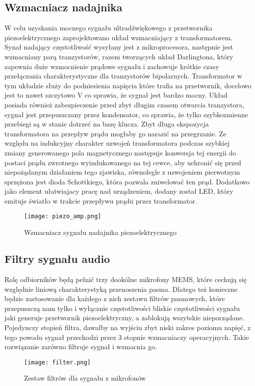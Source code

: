 \subsection{Wzmacniacz nadajnika}
W celu uzyskania mocnego sygnału ultradźwiękowego z przetwornika piezoelektrycznego zaprojektowano układ wzmacniający z transformatorem. 
Synał nadający częstotliwość wysyłany jest z mikroprocesora, następnie jest wzmacniany parą tranzystorów, razem tworzących układ Darlingtona, 
który zapewnia duże wzmocnienie prądowe sygnału i zachowuje krótkie czasy przełączania charakterystyczne dla tranzystorów bipolarnych.
Transformator w tym układzie służy do podniesienia napięcia które trafia na przetwornik, docelowo jest to nawet szczytowo \unit[80]{V} co sprawia, 
że sygnał jest bardzo mocny.
Układ posiada również zabezpieczenie przed zbyt długim czasem otwarcia tranzystora, sygnał jest przepuszczany przez kondensator, 
co sprawia, że tylko szybkozmienne przebiegi są w stanie dotrzeć na bazę klucza. 
Zbyt długa ekspozycja transformatora na przepływ prądu mogłaby go narazić na przegrzanie.
Ze względu na indukcyjny charakter uzwojeń transformatora podczas szybkiej zmiany generowanego pola magnetycznego następuje 
konwersja tej energii do postaci prądu zwrotnego wyindukowanego na tej cewce, aby uchronić się przed niepożądanym działaniem tego zjawiska, 
równolegle z uzwojeniem pierwotnym sprzężona jest dioda Schottkiego, która pozwala zniwelować ten prąd.
Dodatkowo jako element ułatwiajacy pracę nad urządzeniem, dodany został LED, który emituje światło w trakcie przepływu prądu przez transformator.
\begin{figure}[ht!]
    \centering
    \texttt{[image: piezo\_amp.png]}
    \caption{Wzmacniacz sygnału nadajnika piezoelektrycznego}
    \label{fig:piezo_amp}
\end{figure}

\subsection{Filtry sygnału audio}

Rolę odbiorników będą pełnić trzy dookólne mikrofony MEMS, które cechują się względnie liniową charakterystyką przenoszenia pasma. 
Dlatego też konieczne będzie zastosowanie dla każdego z nich zestawu filtrów pasmowych, które przepuszczą nam tylko i wyłącznie częstotliwości bliskie częstotliwości 
sygnału jaki generuje przetwornik piezoelektryczny, a zablokują wszytskie nieporządane. 
Pojedynczy stopień filtra, dawałby na wyjściu zbyt niski zakres poziomu napięć, 
z tego powodu sygnał przechodzi przez 3 stopnie wzmacniaczy operacyjnych. Takie rozwiązanie zarówno filtruje sygnał i wzmacnia go.
\begin{figure}[ht!]
    \centering
    \texttt{[image: filter.png]}
    \caption{Zestaw filtrów dla sygnału z mikrofonów}
    \label{fig:filter}
\end{figure}

